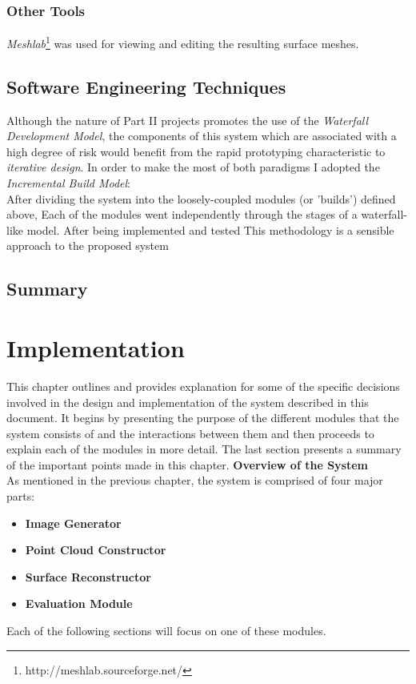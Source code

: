 \documentclass[12pt,a4paper,twoside,openright]{report}
\begin{document}
\subsection{Other Tools}
\textit{Meshlab}\footnote{http://meshlab.sourceforge.net/} was used for  viewing and editing the resulting surface meshes. 

\section{Software Engineering Techniques}
Although the nature of Part II projects promotes the use of the \emph{Waterfall Development Model}, the components of this system which are associated with a high degree of risk would benefit from the rapid prototyping characteristic to \emph{iterative design}. In order to make the most of both paradigms I adopted the \emph{Incremental Build Model}: \\
After dividing the system into the loosely-coupled modules (or 'builds') defined above, 
 Each of the modules went independently through the stages of a waterfall-like model. After being implemented and tested   
\linebreak
This methodology is a sensible approach to the proposed system  

\section{Summary}


\chapter{Implementation}
This chapter outlines and provides explanation for some of the specific decisions involved in the design and implementation of the system described in this document. It begins by presenting the purpose of the different modules that the system consists of and the interactions between them and then proceeds to explain each of the modules in more detail. The last section presents a summary of the important points made in this chapter.
\linebreak
\linebreak
\linebreak
{\Large\textbf{Overview of the System}} \\
\linebreak
As mentioned in the previous chapter, the system is comprised of four major parts:
\begin{itemize}
\item \textbf{Image Generator}
\item \textbf{Point Cloud Constructor} 
\item \textbf{Surface Reconstructor}
\item \textbf{Evaluation Module}
\end{itemize}
Each of the following sections will focus on one of these modules. 
\end{document}

